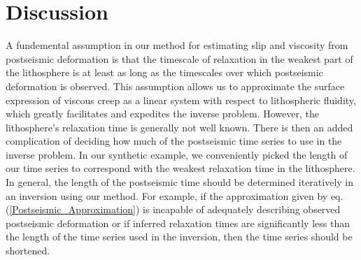 \documentclass[extra,mreferee]{gji}
\begin{document}

\section{Discussion}

A fundemental assumption in our method for estimating slip and
viscosity from postseismic deformation is that the timescale of
relaxation in the weakest part of the lithosphere is at least as long
as the timescales over which postseismic deformation is observed.
This assumption allows us to approximate the surface expression of
viscous creep as a linear system with respect to lithospheric
fluidity, which greatly facilitates and expedites the inverse problem.
However, the lithosphere's relaxation time is generally not well
known.  There is then an added complication of deciding how much of
the postseismic time series to use in the inverse problem.  In our
synthetic example, we conveniently picked the length of our time
series to correspond with the weakest relaxation time in the
lithosphere. In general, the length of the postseismic time should be
determined iteratively in an inversion using our method.  For example,
if the approximation given by eq. (\ref{Postseismic_Approximation}) is
incapable of adequately describing observed postseismic deformation
or if inferred relaxation times are significantly less than the length
of the time series used in the inversion, then the time series should
be shortened.
\end{document}
